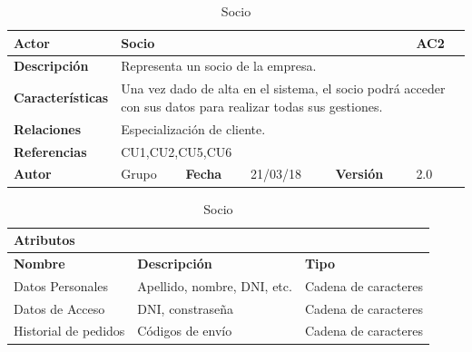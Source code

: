 \documentclass[12pt,spanish]{article}
\begin{document}
\begin{table}[H]

\centering
\begin{tabular}{|m{3cm}|m{4cm}|m{2cm}|m{2cm}|m{2cm}|m{1cm}|}
\hline
\textbf{Actor} &  \multicolumn{4}{m{8cm}|}{Socio} \vline &  \cellcolor{gray!40}AC2 \\
\hline
\textbf{Descripción} & \multicolumn{5}{m{8cm}|}{Representa un socio de la empresa.} \\
\hline
\textbf{Características} & \multicolumn{5}{m{8cm}|}{Una vez dado de alta en el sistema, el socio podrá acceder con sus datos para realizar todas sus gestiones.} \\
\hline
\textbf{Relaciones} &\multicolumn{5}{m{8cm}|}{Especialización de cliente.} \\
\hline
\textbf{Referencias} & \multicolumn{5}{m{8cm}|}{CU1,CU2,CU5,CU6} \\
\hline
\textbf{Autor} & Grupo & \textbf{Fecha} & 21/03/18 & \textbf{Versión} & 2.0 \\
\hline
\end{tabular}

\vspace{1cm}

\begin{tabular}{|m{4cm}|m{7.3cm}|m{4cm}|}
\hline
\multicolumn{3}{|m{15.3cm}|}{\textbf{Atributos}} \\
\hline
\textbf{Nombre} & \textbf{Descripción} & \textbf{Tipo} \\
\hline
Datos Personales & Apellido, nombre, DNI, etc. & Cadena de caracteres \\
\hline
Datos de Acceso & DNI, constraseña & Cadena de caracteres \\
\hline
Historial de pedidos & Códigos de envío & Cadena de caracteres \\
\hline
\end{tabular}

\caption{Socio}

\end{table}
\end{document}
